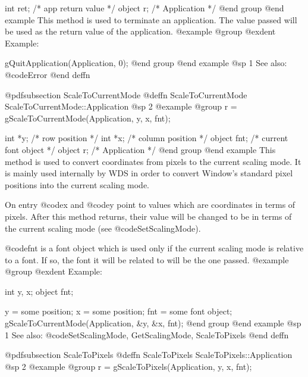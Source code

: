 int     ret;    /*  app return value  */
object  r;      /*  Application       */
@end group
@end example
This method is used to terminate an application.  The value passed will
be used as the return value of the application.
@example
@group
@exdent Example:

gQuitApplication(Application, 0);
@end group
@end example
@sp 1
See also:  @code{Error}
@end deffn











@pdfsubsection {ScaleToCurrentMode}
@deffn {ScaleToCurrentMode} ScaleToCurrentMode::Application
@sp 2
@example
@group
r = gScaleToCurrentMode(Application, y, x, fnt);

int     *y;     /*  row position         */
int     *x;     /*  column position      */
object  fnt;    /*  current font object  */
object  r;      /*  Application          */
@end group
@end example
This method is used to convert coordinates from pixels to the current
scaling mode.  It is mainly used internally by WDS in order to
convert Window's standard pixel positions into the current scaling mode.

On entry @code{x} and @code{y} point to values which are coordinates in
terms of pixels.  After this method returns, their value will be changed
to be in terms of the current scaling mode (see @code{SetScalingMode}).

@code{fnt} is a font object which is used only if the current scaling
mode is relative to a font.  If so, the font it will be related to
will be the one passed.
@example
@group
@exdent Example:

int     y, x;
object  fnt;

y = some position;
x = some position;
fnt = some font object;
gScaleToCurrentMode(Application, &y, &x, fnt);
@end group
@end example
@sp 1
See also:  @code{SetScalingMode, GetScalingMode, ScaleToPixels}
@end deffn















@pdfsubsection {ScaleToPixels}
@deffn {ScaleToPixels} ScaleToPixels::Application
@sp 2
@example
@group
r = gScaleToPixels(Application, y, x, fnt);

